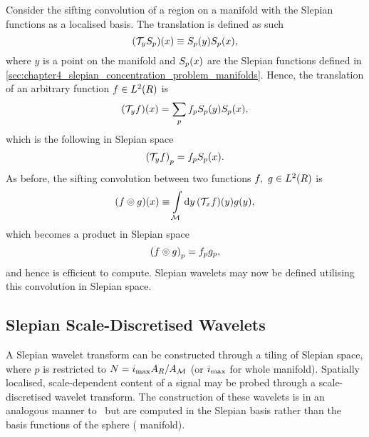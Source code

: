 Consider the sifting convolution of a region on a manifold with the Slepian functions as a localised basis.
The translation is defined as such
%
\begin{equation}
	(\mathcal{T}_{y}{S}_{p})(x)
	\equiv {S}_{p}(y) {S}_{p}(x),
\end{equation}
%
where \(y\) is a point on the manifold and \({S}_{p}(x)\) are the Slepian functions defined in \cref{sec:chapter4_slepian_concentration_problem_manifolds}.
Hence, the translation of an arbitrary function \(f \in L^{2}(R)\) is
%
\begin{equation}
	(\mathcal{T}_{y}f)(x)
	= \sum\limits_{p} {f}_{p} {S}_{p}(y) {S}_{p}(x),
\end{equation}
%
which is the following in Slepian space
%
\begin{equation}
	{(\mathcal{T}_{y}f)}_{p}
	= {f}_{p} {S}_{p}(x).
\end{equation}
%
As before, the sifting convolution between two functions \(f,\ g \in L^{2}(R)\) is
%
\begin{equation}
	(f \circledcirc{} g)(x)
	\equiv \int\limits_{\mathcal{M}} \dd{y} (\mathcal{T}_{x}f)(y) g(y),
\end{equation}
%
which becomes a product in Slepian space
%
\begin{equation}
	{(f \circledcirc{} g)}_{p}
	= {f}_{p} {g}_{p},
\end{equation}
%
and hence is efficient to compute.
Slepian wavelets may now be defined utilising this convolution in Slepian space.

\subsection{Slepian Scale-Discretised Wavelets}\label{sec:chapter4_slepian_scale_discretised_wavelets}

A Slepian wavelet transform can be constructed through a tiling of Slepian space, where \(p\) is restricted to \(N=i_{\text{max}} A_{R}/A_{\mathcal{M}}\) (or \(i_{\text{max}}{}\) for whole manifold).
Spatially localised, scale-dependent content of a signal may be probed through a scale-discretised wavelet transform.
The construction of these wavelets is in an analogous manner to~\cite{Wiaux2008,McEwen2018} but are computed in the Slepian basis rather than the basis functions of the sphere (\cf{} manifold).

